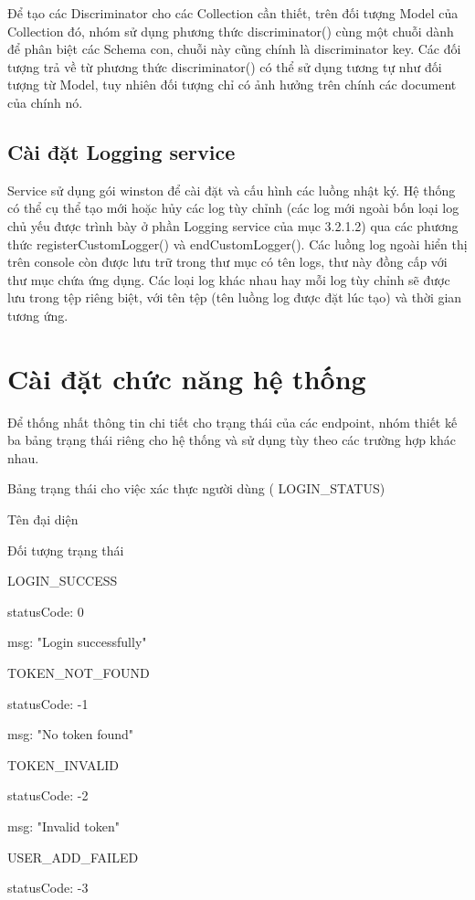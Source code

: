 Để tạo các Discriminator cho các Collection cần thiết, trên đối tượng Model của Collection đó, nhóm sử dụng phương thức discriminator() cùng một chuỗi dành để phân biệt các Schema con, chuỗi này cũng chính là discriminator key. Các đối tượng trả về từ phương thức discriminator() có thể sử dụng tương tự như đối tượng từ Model, tuy nhiên đối tượng chỉ có ảnh hưởng trên chính các document của chính nó.

\subsection{Cài đặt Logging service}

\tab Service sử dụng gói winston để cài đặt và cấu hình các luồng nhật ký. Hệ thống có thể cụ thể tạo mới hoặc hủy các log tùy chỉnh (các log mới ngoài bốn loại log chủ yếu được trình bày ở phần Logging service của mục 3.2.1.2) qua các phương thức registerCustomLogger() và endCustomLogger(). Các luồng log ngoài hiển thị trên console còn được lưu trữ trong thư mục có tên logs, thư này đồng cấp với thư mục chứa ứng dụng. Các loại log khác nhau hay mỗi log tùy chỉnh sẽ được lưu trong tệp riêng biệt, với tên tệp (tên luồng log được đặt lúc tạo) và thời gian tương ứng.

\section{Cài đặt chức năng hệ thống}

\tab Để thống nhất thông tin chi tiết cho trạng thái của các endpoint, nhóm thiết kế ba bảng trạng thái riêng cho hệ thống và sử dụng tùy theo các trường hợp khác nhau.

Bảng trạng thái cho việc xác thực người dùng ( LOGIN\_STATUS)

Tên đại diện

Đối tượng trạng thái

LOGIN\_SUCCESS

statusCode: 0

msg: "Login successfully"

TOKEN\_NOT\_FOUND

statusCode: -1

msg: "No token found"

TOKEN\_INVALID

statusCode: -2

msg: "Invalid token"

USER\_ADD\_FAILED

statusCode: -3

